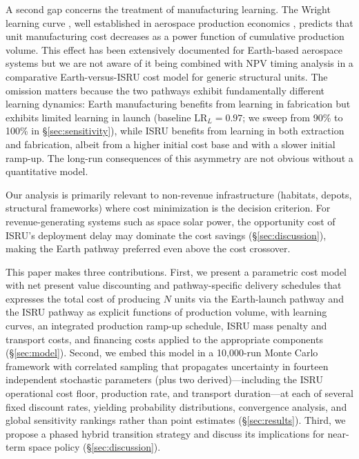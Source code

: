 \documentclass[preprint,12pt]{elsarticle}
\begin{document}
A second gap concerns the treatment of manufacturing learning. The Wright learning curve \cite{wright1936}, well established in aerospace production economics \cite{wertz2011}, predicts that unit manufacturing cost decreases as a power function of cumulative production volume. This effect has been extensively documented for Earth-based aerospace systems \cite{argote1990,nagy2013} but we are not aware of it being combined with NPV timing analysis in a comparative Earth-versus-ISRU cost model for generic structural units. The omission matters because the two pathways exhibit fundamentally different learning dynamics: Earth manufacturing benefits from learning in fabrication but exhibits limited learning in launch (baseline $\mathrm{LR}_L = 0.97$; we sweep from 90\% to 100\% in \S\ref{sec:sensitivity}), while ISRU benefits from learning in both extraction and fabrication, albeit from a higher initial cost base and with a slower initial ramp-up. The long-run consequences of this asymmetry are not obvious without a quantitative model.

Our analysis is primarily relevant to non-revenue infrastructure (habitats, depots, structural frameworks) where cost minimization is the decision criterion. For revenue-generating systems such as space solar power, the opportunity cost of ISRU's deployment delay may dominate the cost savings (\S\ref{sec:discussion}), making the Earth pathway preferred even above the cost crossover.

This paper makes three contributions. First, we present a parametric cost model with net present value discounting and pathway-specific delivery schedules that expresses the total cost of producing $N$ units via the Earth-launch pathway and the ISRU pathway as explicit functions of production volume, with learning curves, an integrated production ramp-up schedule, ISRU mass penalty and transport costs, and financing costs applied to the appropriate components (\S\ref{sec:model}). Second, we embed this model in a 10{,}000-run Monte Carlo framework with correlated sampling that propagates uncertainty in fourteen independent stochastic parameters (plus two derived)---including the ISRU operational cost floor, production rate, and transport duration---at each of several fixed discount rates, yielding probability distributions, convergence analysis, and global sensitivity rankings rather than point estimates (\S\ref{sec:results}). Third, we propose a phased hybrid transition strategy and discuss its implications for near-term space policy (\S\ref{sec:discussion}).
\end{document}

